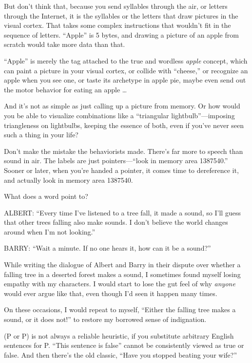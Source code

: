 {
 But don't think that, because you send syllables
through the air, or letters through the Internet, it is the syllables
or the letters that draw pictures in the visual cortex. That takes some
complex instructions that wouldn't fit in the sequence
of letters. ``Apple'' is 5 bytes,
and drawing a picture of an apple from scratch would take more data
than that.}

{
 ``Apple'' is merely the tag
attached to the true and wordless \textit{apple} concept, which can
paint a picture in your visual cortex, or collide with
``cheese,'' or recognize an apple
when you see one, or taste its archetype in apple pie, maybe even send
out the motor behavior for eating an apple \ldots}

{
 And it's not as simple as just calling up a
picture from memory. Or how would you be able to visualize combinations
like a ``triangular
lightbulb''---imposing triangleness on lightbulbs,
keeping the essence of both, even if you've never seen
such a thing in your life?}

{
 Don't make the mistake the behaviorists made.
There's far more to speech than sound in air. The
labels are just pointers---``look in memory area
1387540.'' Sooner or later, when
you're handed a pointer, it comes time to dereference
it, and actually look in memory area 1387540.}

{
 What does a word point to?}

\myendsectiontext


\bigskip


{
 ALBERT: ``Every time I've
listened to a tree fall, it made a sound, so I'll guess
that other trees falling also make sounds. I don't
believe the world changes around when I'm not
looking.''}

{
 BARRY: ``Wait a minute. If no one hears it, how
can it be a sound?''}

{
 While writing the dialogue of Albert and Barry in their dispute
over whether a falling tree in a deserted forest makes a sound, I
sometimes found myself losing empathy with my characters. I would start
to lose the gut feel of why \textit{anyone} would ever argue like that,
even though I'd seen it happen many times.}

{
 On these occasions, I would repeat to myself,
``Either the falling tree makes a sound, or it does
not!'' to restore my borrowed sense of indignation.}

{
 (P or {\textlnot}P) is not always a reliable heuristic, if you
substitute arbitrary English sentences for P. ``This
sentence is false'' cannot be consistently viewed as
true or false. And then there's the old classic,
``Have you stopped beating your
wife?''}

